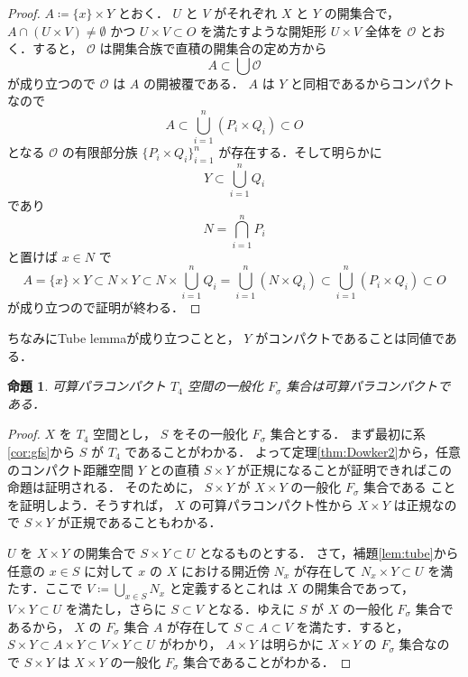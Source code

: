\documentclass[leqno, 12pt]{ltjsarticle}
\newtheorem{prop}[thm]{命題}
\begin{document}
\begin{proof}
$A\coloneqq\{x\}\times Y$
とおく．
$U$
と
$V$
がそれぞれ
$X$
と
$Y$
の開集合で，
$A\cap(U\times V)\neq\emptyset$
かつ
$U\times V\subset O$
を満たすような開矩形
$U\times V$
全体を
$\mathcal{O}$
とおく．すると，
$\mathcal{O}$
は開集合族で直積の開集合の定め方から
\[
A\subset \bigcup \mathcal{O}
\]
が成り立つので
$\mathcal{O}$
は
$A$
の開被覆である．
$A$
は
$Y$
と同相であるからコンパクトなので
\[
A\subset \bigcup_{i=1}^{n}(P_{i}\times Q_{i})\subset O
\]
となる
$\mathcal{O}$
の有限部分族
$\{P_{i}\times Q_{i}\}_{i=1}^{n}$
が存在する．そして明らかに
\[
Y\subset \bigcup_{i=1}^{n}Q_{i}
\]であり
\[
N=\bigcap_{i=1}^{n}P_{i}
\]
と置けば
$x\in N$
で
\[
A=\{x\}\times Y\subset N\times Y\subset N\times \bigcup_{i=1}^{n}Q_{i}=\bigcup_{i=1}^{n}(N\times Q_{i})\subset \bigcup_{i=1}^{n}(P_{i}\times Q_{i})\subset O
\]
が成り立つので証明が終わる．
\end{proof}

ちなみにTube lemmaが成り立つことと，
$Y$
がコンパクトであることは同値である．

\begin{prop}\label{prop:c-gfs}
可算パラコンパクト
$T_{4}$
空間の一般化
$F_{\sigma}$
集合は可算パラコンパクトである．
\end{prop}
\begin{proof}
$X$
を
$T_{4}$
空間とし，
$S$
をその一般化
$F_{\sigma}$
集合とする．
まず最初に系\ref{cor:gfs}から
$S$
が
$T_{4}$
であることがわかる．
よって定理\ref{thm:Dowker2}から，任意のコンパクト距離空間
$Y$
との直積
$S\times Y$
が正規になることが証明できればこの命題は証明される．
そのために，
$S\times Y$
が
$X\times Y$
の一般化
$F_{\sigma}$
集合である
ことを証明しよう．そうすれば，
$X$
の可算パラコンパクト性から
$X\times Y$
は正規なので
$S\times Y$
が正規であることもわかる．

$U$
を
$X\times Y$
の開集合で
$S\times Y\subset U$
となるものとする．
さて，補題\ref{lem:tube}から任意の
$x\in S$
に対して
$x$
の
$X$
における開近傍
$N_{x}$
が存在して
$N_{x}\times Y\subset U$
を満たす．ここで
$V\coloneqq\bigcup_{x\in S}N_{x}$
と定義するとこれは
$X$
の開集合であって，
$V\times Y\subset U$
を満たし，さらに
$S\subset V$
となる．ゆえに
$S$
が
$X$
の一般化
$F_{\sigma}$
集合であるから，
$X$
の
$F_{\sigma}$
集合
$A$
が存在して
$S\subset A\subset V$
を満たす．すると，
$S\times Y\subset A\times Y\subset V\times Y\subset U$
がわかり，
$A\times Y$
は明らかに
$X\times Y$
の
$F_{\sigma}$
集合なので
$S\times Y$
は
$X\times Y$
の一般化
$F_{\sigma}$
集合であることがわかる．
\end{proof}
\end{document}
